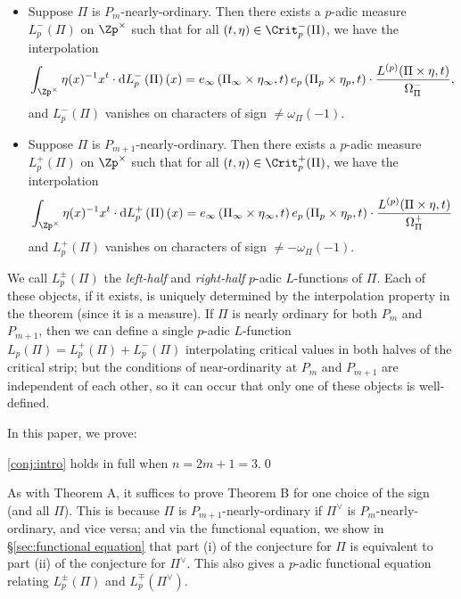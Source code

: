\documentclass[10pt,reqno,a4paper]{amsart}
\newcommand{\GL}{\mathrm{GL}}
\begin{document}
\begin{conjectureintro}[$p$-adic $L$-functions Conjecture for $\GL_{2m+1}$]\leavevmode
\label{conj:intro}
\begin{itemize}
	\item[(i)]	Suppose $\Pi$ is $P_m$-nearly-ordinary. Then there exists a $p$-adic measure $L_p^-(\Pi)$ on $\Zp^\times$ such that for all $(t,\eta) \in \Crit_p^-(\Pi)$, we have the interpolation
	\begin{equation}\label{eq:interpolation intro}
		\int_{\Zp^\times} \eta(x)^{-1} x^t \cdot \mathrm{d}L_p^-\left(\Pi\right)(x) = e_\infty\left(\Pi_\infty \times \eta_\infty, t\right)e_p\left(\Pi_p \times \eta_p, t\right)\cdot \frac{L^{(p)}(\Pi\times\eta, t)}{\Omega_\Pi^-},
	\end{equation}
 and $L_p^-(\Pi)$ vanishes on characters of sign $\ne \omega_\Pi(-1)$.

	
	\item[(ii)] Suppose $\Pi$ is $P_{m+1}$-nearly-ordinary. Then there exists a $p$-adic measure $L_p^+(\Pi)$ on $\Zp^\times$ such that for all $(t ,\eta) \in \Crit_p^+(\Pi)$, we have the interpolation
\[
		\int_{\Zp^\times} \eta(x)^{-1} x^t \cdot \mathrm{d}L_p^+\left(\Pi\right)(x) = e_\infty\left(\Pi_\infty \times \eta_\infty, t\right)e_p\left(\Pi_p \times \eta_p, t\right)\cdot \frac{L^{(p)}(\Pi\times\eta, t)}{\Omega_\Pi^+}
	\]
 and $L_p^+(\Pi)$ vanishes on characters of sign $\ne -\omega_{\Pi}(-1)$.
	\end{itemize}
\end{conjectureintro}


We call $L_p^{\pm}(\Pi)$ the \emph{left-half} and \emph{right-half} $p$-adic $L$-functions of $\Pi$. Each of these objects, if it exists, is uniquely  determined by the interpolation property in the theorem (since it is a measure). If $\Pi$ is nearly ordinary for both $P_m$ and $P_{m+1}$, then we can define a single $p$-adic $L$-function $L_p(\Pi) = L_p^+(\Pi) + L_p^-(\Pi)$ interpolating critical values in both halves of the critical strip; but the conditions of near-ordinarity at $P_m$ and $P_{m+1}$ are independent of each other, so it can occur that only one of these objects is well-defined.

In this paper, we prove:
\begin{theoremintro}\label{thm:intro}
	\cref{conj:intro} holds in full when $n=2m+1=3$.\qed
\end{theoremintro}

As with Theorem A, it suffices to prove Theorem B for one choice of the sign (and all $\Pi$). This is because $\Pi$ is $P_{m+1}$-nearly-ordinary if $\Pi^\vee$ is $P_m$-nearly-ordinary, and vice versa; and via the functional equation, we show in \S \ref{sec:functional equation} that part (i) of the conjecture for $\Pi$ is equivalent to part (ii) of the conjecture for $\Pi^\vee$. This also gives a $p$-adic functional equation relating $L_p^{\pm}(\Pi)$ and $L_p^{\mp}(\Pi^\vee)$.
\end{document}
